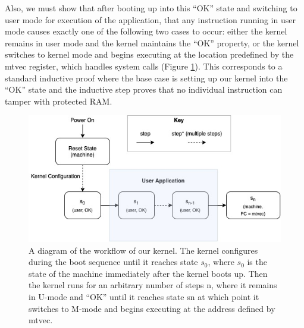 \documentclass[]{article}
\begin{document}
Also, we must show that after booting up into this ``OK'' state and switching to user mode for execution of the application, that any instruction running in user mode causes exactly one of the following two cases to occur: either the kernel remains in user mode and the kernel maintains the ``OK'' property, or the kernel switches to kernel mode and begins executing at the location predefined by the mtvec register, which handles system calls (Figure \ref{fig:figure3}). This corresponds to a standard inductive proof where the base case is setting up our kernel into the ``OK'' state and the inductive step proves that no individual instruction can tamper with protected RAM.

\begin{figure}
    \centering
    \includegraphics{Proof-Diagram.jpg}
    \caption{A diagram of the workflow of our kernel. The kernel
    configures during the boot sequence until it reaches state $s_0$, where $s_0$ is the state of the machine immediately after the kernel boots up. Then the kernel runs for an arbitrary number of steps n, where it remains in U-mode and ``OK'' until it reaches state sn at which point it switches to M-mode and begins executing at the address defined by mtvec.}
    \label{fig:figure3}
\end{figure}
\end{document}
